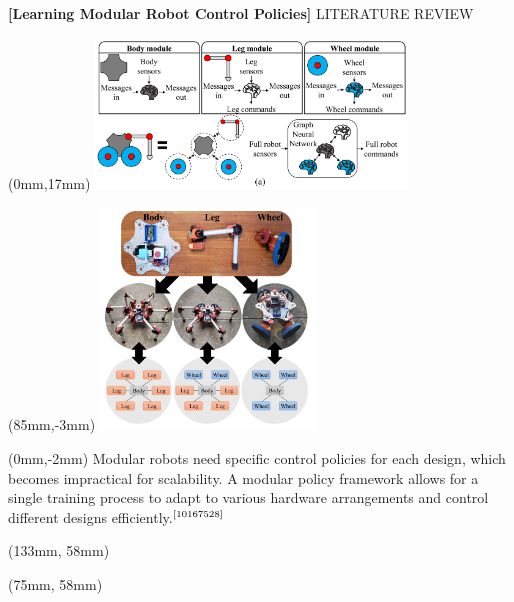 \documentclass[11pt,aspectratio=169]{beamer}
\begin{document}
\begin{frame}[fragile]{\fontsize{10}{10}\selectfont\textbf{[Learning Modular Robot Control Policies]} \hfill \fontsize{8}{8}\selectfont LITERATURE REVIEW \newline [2023]}
    
        \begin{textblock*}{5cm}(0mm,17mm) %
        \includegraphics[height=40mm]{elements/[10]-Modular.png}
        \end{textblock*}

        \begin{textblock*}{5cm}(85mm,-3mm) %
        \includegraphics[height=59mm]{elements/[11]-Modular.png}
        \end{textblock*}

        \begin{textblock*}{87mm}(0mm,-2mm)
        Modular robots need specific control policies for each design, which becomes impractical for scalability. A modular policy framework allows for a single training process to adapt to various hardware arrangements and control different designs efficiently.$^{\text{\cite{10167528}}}$
        \end{textblock*}

        \begin{textblock*}{5cm}(133mm, 58mm) %
        {\tiny \cite{10167528}}
        \end{textblock*}

        \begin{textblock*}{5cm}(75mm, 58mm) %
        {\tiny \cite{10167528}}
        \end{textblock*}
        
        \vspace{52mm}
\end{frame}
\end{document}
